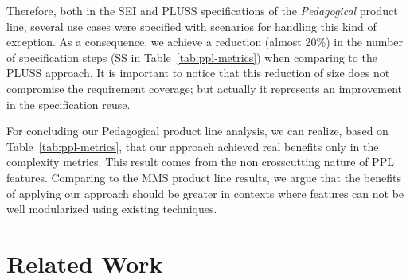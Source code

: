 \documentclass[11pt]{report}
\begin{document}
%    

Therefore, both in the SEI and PLUSS specifications of the \emph{Pedagogical} product line, several use cases were specified with scenarios for handling this kind of exception.
As a consequence, we achieve a reduction (almost 20\%) in the number of specification steps (SS in Table~\ref{tab:ppl-metrics}) when comparing to the PLUSS approach. It is important to notice that this reduction of size does not compromise the requirement coverage; but actually it represents an improvement in the specification reuse.

For concluding our Pedagogical product line analysis, we can realize, based on Table~\ref{tab:ppl-metrics}, that our approach achieved real benefits only in the complexity metrics. This result comes from the non crosscutting nature of PPL features. Comparing to the MMS product line results, we argue that the benefits of applying our approach should be greater in contexts where features can not be well modularized using existing techniques. 
   
\section{Related Work}
\label{sec:related}
\end{document}
